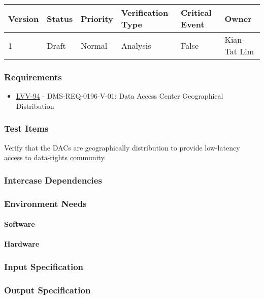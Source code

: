 \begin{longtable}[]{llllll}
\toprule
Version & Status & Priority & Verification Type & Critical Event & Owner
\\\midrule
1 & Draft & Normal &
Analysis & False & Kian-Tat Lim
\\\bottomrule
\end{longtable}

\subsubsection{Requirements}
\begin{itemize}
\item \href{https://jira.lsstcorp.org/browse/LVV-94}{LVV-94} - DMS-REQ-0196-V-01: Data Access Center Geographical Distribution
\end{itemize}

\subsubsection{Test Items}
Verify that the DACs are geographically distribution to provide
low-latency access to data-rights community.



\subsubsection{Intercase Dependencies}

\subsubsection{Environment Needs}

\paragraph{Software}

\paragraph{Hardware}

\subsubsection{Input Specification}

\subsubsection{Output Specification}


